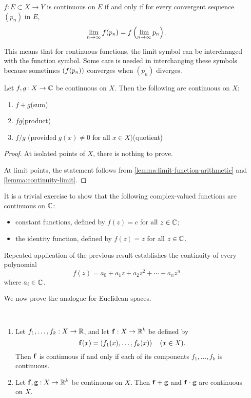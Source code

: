 \begin{corollary}
$f\colon E\subset X\to Y$ is continuous on $E$ if and only if for every convergent sequence $(p_n)$ in $E$,
\[\lim_{n\to\infty}f(p_n)=f\left(\lim_{n\to\infty}p_n\right).\]
\end{corollary}

\begin{remark}
This means that for continuous functions, the limit symbol can be interchanged with the function symbol. Some care is needed in interchanging these symbols because sometimes $\left(f(p_n)\right)$ converges when $(p_n)$ diverges.
\end{remark}

\begin{lemma}\label{lemma:continuity-arithmetic}
Let $f,g\colon X\to\mathbb C$ be continuous on $X$. Then the following are continuous on $X$:
\begin{enumerate}[label=(\roman*)]
\item $f+g$\hfill(sum)
\item $fg$\hfill(product)
\item $f/g$ (provided $g(x)\neq0$ for all $x\in X$)\hfill(quotient)
\end{enumerate}
\end{lemma}

\begin{proof}
At isolated points of $X$, there is nothing to prove. 

At limit points, the statement follows from \ref{lemma:limit-function-arithmetic} and \ref{lemma:continuity-limit}.
\end{proof}

\begin{example}
It is a trivial exercise to show that the following complex-valued functions are continuous on $\mathbb C$:
\begin{itemize}
\item constant functions, defined by $f(z)=c$ for all $z\in\mathbb C$;
\item the identity function, defined by $f(z)=z$ for all $z\in\mathbb C$.
\end{itemize}
Repeated application of the previous result establishes the continuity of every polynomial
\[f(z)=a_0+a_1z+a_2z^2+\cdots+a_nz^n\]
where $a_i\in\mathbb C$.
\end{example}

We now prove the analogue for Euclidean spaces.

\begin{lemma} \
\begin{enumerate}[label=(\roman*)]
\item Let $f_1,\dots,f_k:X\to\mathbb R$, and let $\vb{f}:X\to\mathbb R^k$ be defined by
\[\vb{f}(x)=\left(f_1(x),\dots,f_k(x)\right)\quad(x\in X).\]
Then $\vb{f}$ is continuous if and only if each of its components $f_1,\dots,f_k$ is continuous.

\item Let $\vb{f},\vb{g}:X\to\mathbb R^k$ be continuous on $X$. Then $\vb{f}+\vb{g}$ and $\vb{f}\cdot\vb{g}$ are continuous on $X$.
\end{enumerate}
\end{lemma}

